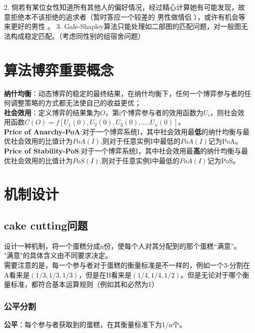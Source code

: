 \documentclass[11pt]{ctexart}
\begin{document}
2. 倘若有某位女性知道所有其他人的偏好情况，经过精心计算她有可能发现，故意拒绝本不该拒绝的追求者（暂时答应一个较差的 男性做情侣 ），或许有机会等来更好的男性 。
3. Gale-Shapley算法只能处理如二部图的匹配问题，对一般图无法构成稳定匹配。（考虑同性别的组宿舍问题）

\section{算法博弈重要概念}
\textbf{纳什均衡}：动态博弈的稳定的最终结果，在纳什均衡下，任何一个博弈参与者的任何调整策略的方式都无法使自己的收益更优；\\

\textbf{社会效用}：定义博弈的结果集为$O$，第i个博弈参与者的效用函数为$U_i$，则社会效用函数$C(O)=f[U_1(0),U_2(0),U_3(0)……U_n(0)]$。\\

\textbf{Price of Anarchy-PoA}:对于一个博弈系统I，其中社会效用最\textbf{低}的纳什均衡与最优社会效用的比值计为$PoA(I)$,则对于任意实例I中最低$的PoA(I)$记为PoA。  \\

\textbf{Price of Stability-PoS}:对于一个博弈系统I，其中社会效用最\textbf{高}的纳什均衡与最优社会效用的比值计为$PoS(I)$,则对于任意实例I中最低的$PoA(I)$记为PoS。 \\

\section{机制设计}

\subsection{cake cutting问题}
设计一种机制，将一个蛋糕分成n份，使每个人对其分配到的那个蛋糕“满意”。\\
"满意"的具体含义由不同要求决定。\\

需要注意的是，每一个参与者对于蛋糕的衡量标准是不一样的，例如一个3-分割在A看来是$(1/3,1/3,1/3)$，但是在B看来是$(1/4,1/4,1/2)$。但是无论对于哪个衡量标准，都符合基本运算规则（例如其和必然为1）\\

\subsubsection{公平分割}
\textbf{公平}：每个参与者获取到的蛋糕，在其衡量标准下为1/n个。\\
\end{document}
